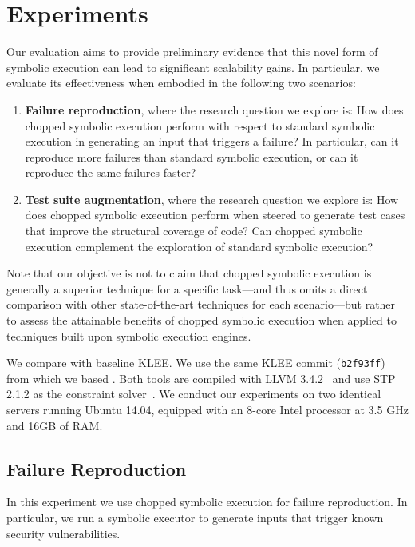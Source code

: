 
\chapter{Experiments}\label{chapter:experiments}

Our evaluation aims to provide preliminary evidence that this novel
form of symbolic execution can lead to significant scalability
gains. In particular, we evaluate its effectiveness when embodied in
the following two scenarios:

\begin{enumerate}[leftmargin=*]
\item \textbf{Failure reproduction}, where the research question we
  explore is: How does chopped symbolic execution perform with respect
  to standard symbolic execution in generating an input that triggers
  a failure? In particular, can it reproduce more failures than standard
  symbolic execution, or can it reproduce the same failures faster?

\item \textbf{Test suite augmentation}, where the research question we
  explore is: How does chopped symbolic execution perform when steered
  to generate test cases that improve the structural coverage of code?
  Can chopped symbolic execution complement the exploration of
  standard symbolic execution?
\end{enumerate}

Note that our objective is not to claim that chopped symbolic
execution is generally a superior technique for a specific task---and
thus omits a direct comparison with other state-of-the-art techniques
for each scenario---but rather to assess the attainable benefits of
chopped symbolic execution when applied to techniques built upon
symbolic execution engines.

We compare \toolname with baseline KLEE. We use the same KLEE commit
(\texttt{b2f93ff}) from which we based \toolname.  Both tools are
compiled with LLVM 3.4.2~\cite{llvm} and use STP 2.1.2 as the
constraint solver~\cite{stp}. We conduct our experiments on two
identical servers running Ubuntu 14.04, equipped with an 8-core Intel
processor at 3.5 GHz and 16GB of RAM.

\section{Failure Reproduction}\label{sec:disc-secur-vuln}
In this experiment we use chopped symbolic execution for failure
reproduction. In particular, we run a symbolic executor to generate
inputs that trigger known security vulnerabilities.

